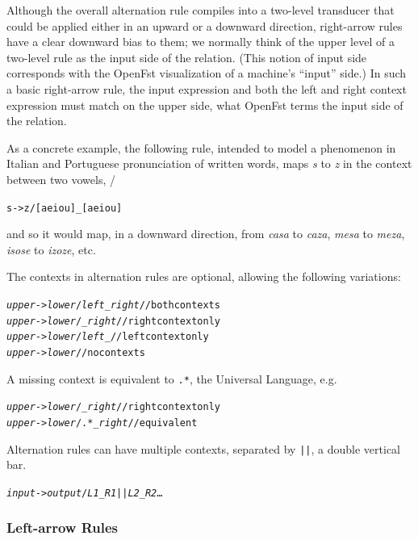 \documentclass[letterpaper,12pt]{article}
\begin{document}
Although the overall alternation rule compiles into a two-level transducer that could be applied either in an
upward or a downward direction, right-arrow rules have a clear downward bias to them;
we normally think of the upper level of a two-level rule as the input side of the
relation.  (This notion of input side corresponds with the OpenFst visualization of a
machine's ``input'' side.)
In such a basic right-arrow rule, the input expression and both the left
and right context expression must match on the upper side, what OpenFst terms the
input side of the relation.

As a concrete example, the following rule, intended to model a phenomenon in Italian and Portuguese pronunciation of
written words, maps \emph{s} to \emph{z} in the context between two vowels,
/
\begin{alltt}
s -> z / [aeiou] _ [aeiou]
\end{alltt}

\noindent
and so it would map, in a downward direction, from \emph{casa} to \emph{caza}, \emph{mesa} to \emph{meza},
\emph{isose} to \emph{izoze}, etc.

The contexts in alternation rules are optional, allowing the following variations:

\begin{alltt}
\emph{upper} -> \emph{lower} / \emph{left} _ \emph{right}		// both contexts
\emph{upper} -> \emph{lower} /     _ \emph{right}		// right context only
\emph{upper} -> \emph{lower} / \emph{left} _ 			// left context only
\emph{upper} -> \emph{lower} 									// no contexts
\end{alltt}

\noindent
A missing context is equivalent to \verb!.*!, the Universal Language, e.g.

\begin{alltt}
\emph{upper} -> \emph{lower} /    _ \emph{right}	// right context only
\emph{upper} -> \emph{lower} / .* _ \emph{right}	// equivalent
\end{alltt}


Alternation rules can have multiple contexts, separated by \texttt{||}, a double
vertical bar.

\begin{alltt}
\emph{input} -> \emph{output} / \emph{L1} _ \emph{R1} || \emph{L2} _ \emph{R2} \ldots
\end{alltt}

\subsubsection{Left-arrow Rules}
\end{document}
